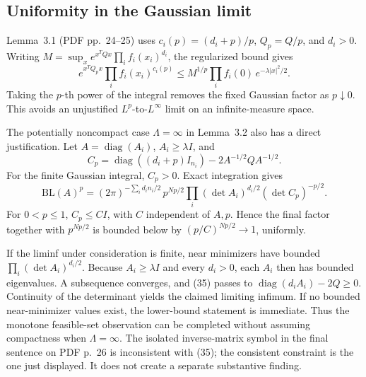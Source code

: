 \documentclass[10pt]{article}
\begin{document}
\subsection*{Uniformity in the Gaussian limit}
Lemma 3.1 (PDF pp. 24–25) uses \(c_i(p)=(d_i+p)/p\), \(Q_p=Q/p\), and \(d_i>0\). Writing \(M=\sup_x e^{x^TQx}\prod_i f_i(x_i)^{d_i}\), the regularized bound gives \[e^{x^TQ_px}\prod_i f_i(x_i)^{c_i(p)}
 \le M^{1/p}\prod_i f_i(0)\,e^{-\lambda|x|^2/2}.\] Taking the \(p\)-th power of the integral removes the fixed Gaussian factor as \(p\downarrow0\). This avoids an unjustified \(L^p\)-to-\(L^\infty\) limit on an infinite-measure space.\par
The potentially noncompact case \(\Lambda=\infty\) in Lemma 3.2 also has a direct justification. Let \(A=\operatorname{diag}(A_i)\), \(A_i\ge\lambda I\), and \[C_p=\operatorname{diag}((d_i+p)I_{n_i})-2A^{-1/2}QA^{-1/2}.\] For the finite Gaussian integral, \(C_p>0\). Exact integration gives \[\mathrm{BL}(A)^p
 =(2\pi)^{-\sum_i d_i n_i/2}\,
 p^{Np/2}\prod_i(\det A_i)^{d_i/2}
 (\det C_p)^{-p/2}.\] For \(0<p\le1\), \(C_p\le CI\), with \(C\) independent of \(A,p\). Hence the final factor together with \(p^{Np/2}\) is bounded below by \((p/C)^{Np/2}\to1\), uniformly.\par
If the liminf under consideration is finite, near minimizers have bounded \(\prod_i(\det A_i)^{d_i/2}\). Because \(A_i\ge\lambda I\) and every \(d_i>0\), each \(A_i\) then has bounded eigenvalues. A subsequence converges, and (35) passes to \(\operatorname{diag}(d_iA_i)-2Q\ge0\). Continuity of the determinant yields the claimed limiting infimum. If no bounded near-minimizer values exist, the lower-bound statement is immediate. Thus the monotone feasible-set observation can be completed without assuming compactness when \(\Lambda=\infty\). The isolated inverse-matrix symbol in the final sentence on PDF p. 26 is inconsistent with (35); the consistent constraint is the one just displayed. It does not create a separate substantive finding.\par
\end{document}
